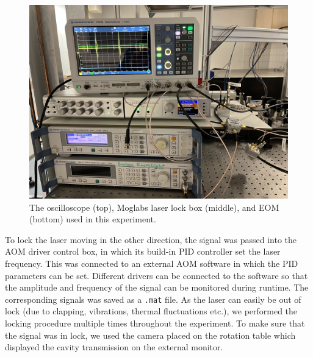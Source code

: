 \documentclass[a4paper]{report}
\numberwithin{equation}{section}
\begin{document}
\begin{figure}[h!]
	\centering
	\includegraphics[width=0.8\columnwidth]{devices_picture.jpg}
	\caption{The oscilloscope (top), Moglabs laser lock box (middle), and EOM (bottom) used in this experiment.}
	\label{fig:exp_setup_devices}
\end{figure}

To lock the laser moving in the other direction, the signal was passed into the AOM driver control box, in which its 
build-in PID controller set the laser frequency. This was connected to an external AOM software in which the PID parameters can be set. 
Different drivers can be connected to the software so that the amplitude and frequency of the signal can be monitored during runtime. 
The corresponding signals was saved as a \texttt{.mat} file. As the laser can easily be out of lock (due to clapping, vibrations, thermal fluctuations etc.), we performed the locking procedure
multiple times throughout the experiment. To make sure that the signal was in lock, we used the camera placed on the rotation table which
displayed the cavity transmission on the external monitor. \par 

\end{document}
